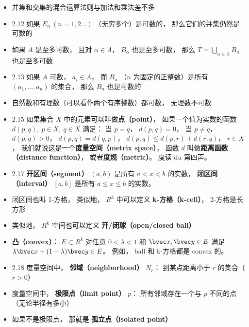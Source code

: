 \begin{itemize}
\item 并集和交集的混合运算法则与加法和乘法差不多

\item 2.12 如果 $E_n\ (n = 1, 2\dots)$ （无穷多个）是可数的， 那么它们的并集仍然是可数的

\item 如果 $A$ 是至多可数， 且对 $\alpha \in A$， $B_\alpha$ 也是至多可数， 那么 $T = \bigcup_{\alpha \in A} B_\alpha$ 也是至多可数

\item 2.13 如果 $A$ 可数， $a_i \in A$，  而 $B_n$ （$n$ 为固定的正整数）是所有 $(a_1, \dots, a_n)$ 的集合， 那么 $B_n$ 也是可数的

\item 自然数和有理数（可以看作两个有序整数）都可数， 无理数不可数

\item 2.15 如果集合 $X$ 中的元素可以叫做\textbf{点（point）}， 如果一个值为实数的函数 $d(p, q), \ p \in X,\ q \in X$ 满足： 当 $p = q$， $d(p, q) = 0$， 当 $p \ne q$， $d(p, q) > 0$， $d(p, q) = d(q, p)$， $d(p, q) \leqslant d(p, r) + d(r, q)$， $r \in X$， 我们就说这是一个\textbf{度量空间（metrix space）}， 函数 $d$ 叫做\textbf{距离函数（distance function）}， 或者\textbf{度规（metric）}。 度读 du 第四声。

\item 2.17 \textbf{开区间（segment）} $(a, b)$ 是所有 $a < x < b$ 的实数， \textbf{闭区间（interval）} $[a, b]$ 是所有 $a \leqslant x \leqslant b$ 的实数。

\item 闭区间也叫 1-方格， 类似地， $R^k$ 中可以定义 \textbf{k-方格（k-cell）}， 2-方格是长方形

\item 类似地， $R^k$ 空间也可以定义 \textbf{开/闭球（open/closed ball）}

\item \textbf{凸（convex）}： $E \subset R^k$ 对任意 $0 < \lambda < 1$ 和 $\bvec x, \bvec y \in E$ 满足 $\lambda \bvec x + (1 - \lambda) \bvec y \in E$。 例如， ball 和 k-方格都是 convex 的。

\item 2.18 度量空间中， \textbf{邻域（neighborhood）} $N_r$： 到某点距离小于 $r$ 的集合（$r > 0$）

\item 度量空间中， \textbf{极限点（limit point）} $p$： 所有邻域存在一个与 $p$ 不同的点（无论半径有多小）

\item 如果不是极限点， 那就是 \textbf{孤立点（isolated point）}


\end{itemize}
